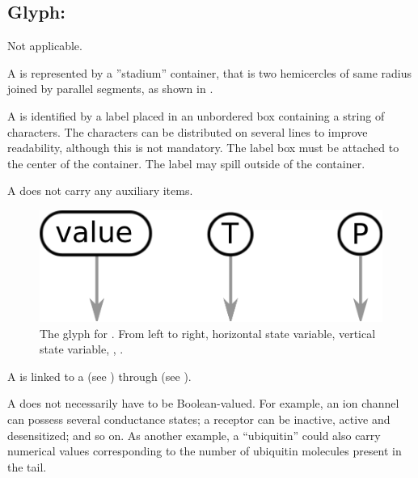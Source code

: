
\subsection{Glyph: }
\label{sec:variableValue}

\begin{glyphDescription}
 
\glyphSboTerm Not applicable.
 
\glyphContainer A  is represented by a ''stadium'' container, that is two hemicercles of same radius joined by parallel segments, as shown in . 
 
\glyphLabel A  is identified by a label placed in an unbordered box containing a string of characters.  The characters can be distributed on several lines to improve readability, although this is not mandatory.  The label box must be attached to the center of the container.  The label may spill outside of the container.

\glyphAux A  does not carry any auxiliary items.  
 
\end{glyphDescription}
 
\begin{figure}[H]
   \centering
   \includegraphics[scale = 0.3]{images/variableValue}
   \caption{The \ER glyph for . From left to right, horizontal state variable, vertical state variable, , .}
   \label{fig:var-value}
\end{figure}

A  is linked to a  (see ) through  (see ). 

A  does not necessarily have to be Boolean-valued.  For example, an ion channel can possess several conductance states; a receptor can be inactive, active and desensitized; and so on.  As another example, a  ``ubiquitin'' could also carry numerical values corresponding to the number of ubiquitin molecules present in the tail.

